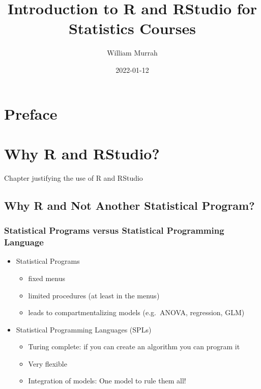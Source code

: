 \documentclass[
]{book}
\title{Introduction to R and RStudio for Statistics Courses}
\author{William Murrah}
\date{2022-01-12}
\providecommand{\tightlist}{%
  \setlength{\itemsep}{0pt}\setlength{\parskip}{0pt}}
\begin{document}
\maketitle

{
\setcounter{tocdepth}{1}
\tableofcontents
}
\hypertarget{preface}{%
\chapter*{Preface}\label{preface}}

\hypertarget{intro}{%
\chapter{Why R and RStudio?}\label{intro}}

Chapter justifying the use of R and RStudio

\hypertarget{why-r-and-not-another-statistical-program}{%
\section{Why R and Not Another Statistical Program?}\label{why-r-and-not-another-statistical-program}}

\hypertarget{statistical-programs-versus-statistical-programming-language}{%
\subsection{Statistical Programs versus Statistical Programming Language}\label{statistical-programs-versus-statistical-programming-language}}

\begin{itemize}
\tightlist
\item
  Statistical Programs

  \begin{itemize}
  \tightlist
  \item
    fixed menus
  \item
    limited procedures (at least in the menus)
  \item
    leads to compartmentalizing models (e.g.~ANOVA, regression, GLM)
  \end{itemize}
\item
  Statistical Programming Languages (SPLs)

  \begin{itemize}
  \tightlist
  \item
    Turing complete: if you can create an algorithm you can program it
  \item
    Very flexible
  \item
    Integration of models: One model to rule them all!
  \end{itemize}
\end{itemize}
\end{document}
